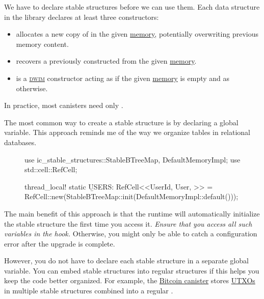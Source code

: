 \documentclass{article}
\begin{document}
We have to declare stable structures before we can use them.
Each data structure  in the library declares at least three constructors:
\begin{itemize}
  \item{} allocates a new copy of  in the given \href{#memory}{memory}, potentially overwriting previous memory content.
  \item{} recovers a previously constructed  from the given \href{#memory}{memory}.
  \item{} is a \href{https://en.wikipedia.org/wiki/DWIM}{\textsc{dwim}} constructor acting as  if the given \href{#memory}{memory} is empty and as  otherwise.
\end{itemize}

In practice, most canisters need only .

The most common way to create a stable structure is by declaring a global variable.
This approach reminds me of the way we organize tables in relational databases.

\begin{figure}
\begin{code}[rust]
use ic_stable_structures::{StableBTreeMap, DefaultMemoryImpl};
use std::cell::RefCell;

thread_local! {
  static \b{USERS}: RefCell<\href{#stable-btree}{}<UserId, User, \href{#default-memory-impl}{}>> =
    RefCell::new(StableBTreeMap::init(DefaultMemoryImpl::default()));
}
\end{code}
\end{figure}

The main benefit of this approach is that the runtime will automatically initialize the stable structure the first time you access it.
\emph{Ensure that you access all such variables in the  hook.}
Otherwise, you might only be able to catch a configuration error after the upgrade is complete.

However, you do not have to declare each stable structure in a separate global variable.
You can embed stable structures into regular structures if this helps you keep the code better organized.
For example, the \href{https://github.com/dfinity/bitcoin-canister}{Bitcoin canister} stores \href{https://github.com/dfinity/bitcoin-canister/blob/9242d5f9a784ac115c2042fd09705dd9321ff7b7/canister/src/utxo_set/utxos.rs#L51}{UTXOs} in multiple stable structures combined into a regular .
\end{document}
